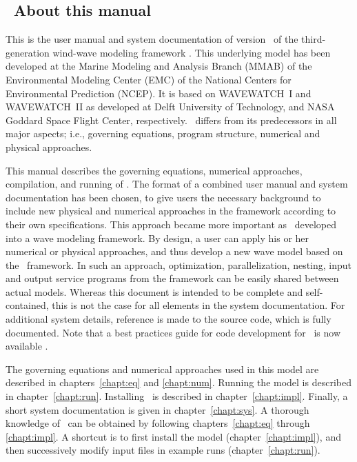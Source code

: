 \vssub
\subsection{~About this manual}
\vssub

This is the user manual and system documentation of version \WWver\ of the
third-generation wind-wave modeling framework \ww. This underlying model has
been developed at the Marine Modeling and Analysis Branch (MMAB) of the
Environmental Modeling Center (EMC) of the National Centers for Environmental
Prediction (NCEP). It is based on WAVEWATCH~I and WAVEWATCH~II as developed at
Delft University of Technology, and NASA Goddard Space Flight Center,
respectively. \ws\ differs from its predecessors in all major aspects; i.e.,
governing equations, program structure, numerical and physical approaches.

This manual describes the governing equations, numerical approaches,
compilation, and running of \ws. The format of a combined user manual and
system documentation has been chosen, to give users the necessary background
to include new physical and numerical approaches in the framework according to
their own specifications.  This approach became more important as \ws\
developed into a wave modeling framework. By design, a user can apply his or
her numerical or physical approaches, and thus develop a new wave model based
on the \ws\ framework. In such an approach, optimization, parallelization,
nesting, input and output service programs from the framework can be easily
shared between actual models.  Whereas this document is intended to be
complete and self-contained, this is not the case for all elements in the
system documentation. For additional system details, reference is made to the
source code, which is fully documented. Note that a best practices guide for
code development for \ws\ is now available \citep{tol:MMAB10a, tol:MMAB14b}.

The governing equations and numerical approaches used in this model are
described in chapters~\ref{chapt:eq} and \ref{chapt:num}. Running the model is
described in chapter~\ref{chapt:run}. Installing \ws\ is described in
chapter~\ref{chapt:impl}. Finally, a short system documentation is given in
chapter~\ref{chapt:sys}. A thorough knowledge of \ws\ can be obtained by
following chapters~\ref{chapt:eq} through \ref{chapt:impl}. A shortcut is to
first install the model (chapter~\ref{chapt:impl}), and then successively
modify input files in example runs (chapter~\ref{chapt:run}).


